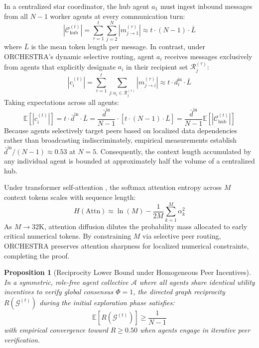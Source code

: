 \documentclass{ieeeaccess}
\newtheorem{proposition}{Proposition}
\begin{document}
\begin{IEEEproof}
In a centralized star coordinator, the hub agent $a_1$ must ingest inbound messages from all $N-1$ worker agents at every communication turn:
\begin{equation}
|\mathcal{C}_{\text{hub}}^{(t)}| = \sum_{\tau=1}^t \sum_{j=2}^N |m_{j \to 1}^{(\tau)}| \approx t \cdot (N-1) \cdot \bar{L}
\end{equation}
where $\bar{L}$ is the mean token length per message. In contrast, under ORCHESTRA's dynamic selective routing, agent $a_i$ receives messages exclusively from agents that explicitly designate $a_i$ in their recipient set $\mathcal{R}_j^{(\tau)}$:
\begin{equation}
|c_i^{(t)}| = \sum_{\tau=1}^t \sum_{j: a_i \in \mathcal{R}_j^{(\tau)}} |m_{j \to i}^{(\tau)}| \approx t \cdot d_i^{\text{in}} \cdot \bar{L}
\end{equation}
Taking expectations across all agents:
\begin{equation}
\mathbb{E}[|c_i^{(t)}|] = t \cdot \bar{d}^{\text{in}} \cdot \bar{L} = \frac{\bar{d}^{\text{in}}}{N-1} \cdot \left[ t \cdot (N-1) \cdot \bar{L} \right] = \frac{\bar{d}^{\text{in}}}{N-1} \mathbb{E}[|\mathcal{C}_{\text{hub}}^{(t)}|]
\end{equation}
Because agents selectively target peers based on localized data dependencies rather than broadcasting indiscriminately, empirical measurements establish $\bar{d}^{\text{in}} / (N-1) \approx 0.53$ at $N=5$. Consequently, the context length accumulated by any individual agent is bounded at approximately half the volume of a centralized hub.

Under transformer self-attention \cite{vaswani2017attention}, the softmax attention entropy across $M$ context tokens scales with sequence length:
\begin{equation}
H(\text{Attn}) \approx \ln(M) - \frac{1}{2M} \sum_{k=1}^M \alpha_k^2
\end{equation}
As $M \to 32\text{K}$, attention diffusion dilutes the probability mass allocated to early critical numerical tokens. By constraining $M$ via selective peer routing, ORCHESTRA preserves attention sharpness for localized numerical constraints, completing the proof.
\end{IEEEproof}

\begin{proposition}[Reciprocity Lower Bound under Homogeneous Peer Incentives]
\label{prop:reciprocity_bound}
In a symmetric, role-free agent collective $\mathcal{A}$ where all agents share identical utility incentives to verify global consensus $\Phi = 1$, the directed graph reciprocity $R(\mathcal{G}^{(t)})$ during the initial exploration phase satisfies:
\begin{equation}
\label{eq:reciprocity_bound}
\mathbb{E}[R(\mathcal{G}^{(t)})] \ge \frac{1}{N-1}
\end{equation}
with empirical convergence toward $R \ge 0.50$ when agents engage in iterative peer verification.
\end{proposition}
\end{document}
